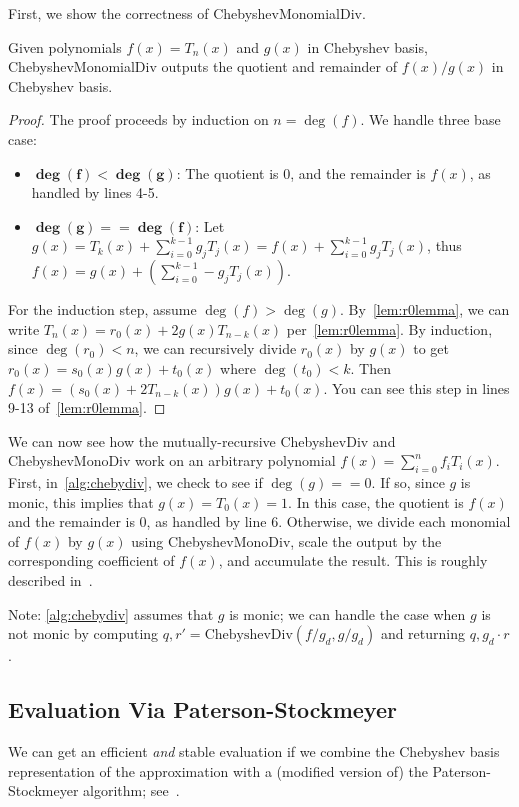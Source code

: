 \documentclass[../fheimpl.tex]{subfiles}
\begin{document}
	First, we show the correctness of \textrm{ChebyshevMonomialDiv}.
	\begin{lemma}
		\label{lem:chebymonodiv}
		Given polynomials $f(x)=T_n(x)$ and $g(x)$ in Chebyshev basis, \textrm{ChebyshevMonomialDiv} outputs the quotient and remainder of $f(x)/g(x)$ in Chebyshev basis.
	\end{lemma}
	\begin{proof}
		The proof proceeds by induction on $n=\deg(f)$. We handle three base case:
		\begin{itemize}
			
			\item $\bm{\deg(f) < \deg(g)}$: The quotient is 0, and the remainder is $f(x)$, as handled by lines 4-5.
			
			\item $\bm{\deg(g) == \deg(f)}$: Let $g(x) = T_k(x) + \sum_{i=0}^{k-1}g_jT_j(x) = f(x) + \sum_{i=0}^{k-1}g_jT_j(x)$, thus $f(x) = g(x) + \left(\sum_{i=0}^{k-1}-g_jT_j(x)\right)$.
		\end{itemize}
		
		For the induction step, assume $\deg(f) > \deg(g)$. By~\cref{lem:r0lemma}, we can write $T_n(x) = r_0(x) + 2g(x)T_{n-k}(x)$ per~\cref{lem:r0lemma}. By induction, since $\deg(r_0)<n$, we can recursively divide $r_0(x)$ by $g(x)$ to get $r_0(x) = s_0(x)g(x)+t_0(x)$ where $\deg(t_0)<k$. Then $f(x) = (s_0(x)+2T_{n-k}(x))g(x)+t_0(x)$. You can see this step in lines 9-13 of~\cref{lem:r0lemma}.
	\end{proof}
	
	We can now see how the mutually-recursive \textrm{ChebyshevDiv} and \textrm{ChebyshevMonoDiv} work on an arbitrary polynomial $f(x)=\sum_{i=0}^n f_iT_i(x)$. First, in~\cref{alg:chebydiv}, we check to see if $\deg(g) == 0$. If so, since $g$ is monic, this implies that $g(x)=T_0(x)=1$. In this case, the quotient is $f(x)$ and the remainder is 0, as handled by line 6. Otherwise, we divide each monomial of $f(x)$ by $g(x)$ using \textrm{ChebyshevMonoDiv}, scale the output by the corresponding coefficient of $f(x)$, and accumulate the result. This is roughly described in~\cite{cryptoeprint:2018/1043}.
	
	Note: \cref{alg:chebydiv} assumes that $g$ is monic; we can handle the case when $g$ is not monic by computing $q,r' = \textrm{ChebyshevDiv}(f/g_d, g/g_d)$ and returning $q, g_d\cdot r$.
	
	\subsection{Evaluation Via Paterson-Stockmeyer}
	We can get an efficient \emph{and} stable evaluation if we combine the Chebyshev basis representation of the approximation with a (modified version of) the Paterson-Stockmeyer algorithm; see~\cite{cryptoeprint:2018/1043}.
	
\end{document}
